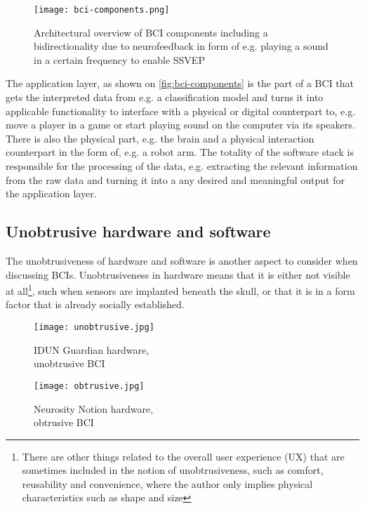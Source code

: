 \begin{figure}[ht]
  \centering
  \texttt{[image: bci-components.png]}
  \caption{Architectural overview of BCI components including a bidirectionality due to neurofeedback in form of e.g. playing a sound in a certain frequency to enable SSVEP}
  \label{fig:bci-components}
\end{figure}

 The application layer, as shown on \autoref{fig:bci-components} is the part of a BCI that gets the interpreted data from e.g. a classification model and turns it into applicable functionality to interface with a physical or digital counterpart to, e.g. move a player in a game or start playing sound on the computer via its speakers. There is also the physical part, e.g. the brain and a physical interaction counterpart in the form of, e.g. a robot arm. The totality of the software stack is responsible for the processing of the data, e.g. extracting the relevant information from the raw data and turning it into a any desired and meaningful output for the application layer.

\subsection{Unobtrusive hardware and software}
\label{chapter2-unobtrusive-hardware-and-software}

The unobtrusiveness of hardware and software is another aspect to consider when discussing BCIs. Unobtrusiveness in hardware means that it is either not visible at all\footnote{There are other things related to the overall user experience (UX) that are sometimes included in the notion of unobtrusiveness, such as comfort, reusability and convenience, where the author only implies physical characteristics such as shape and size}, such when sensors are implanted beneath the skull, or that it is in a form factor that is already socially established.

\begin{figure}[!ht]
  \texttt{[image: unobtrusive.jpg]}
  \caption{IDUN Guardian hardware, \\ unobtrusive BCI}
  \label{fig:unobstrusive-hardware}
  \endminipage\hfill
  \texttt{[image: obtrusive.jpg]}
  \caption{Neurosity Notion hardware, \\ obtrusive BCI}
  \label{fig:obstrusive-hardware}
  \endminipage\hfill
\end{figure}

